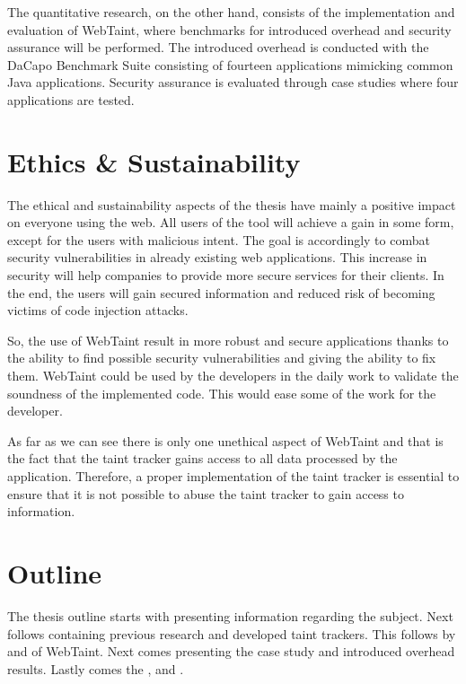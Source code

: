 The quantitative research, on the other hand, consists of the implementation and evaluation of WebTaint, where benchmarks for introduced overhead and security assurance will be performed. The introduced overhead is conducted with the DaCapo Benchmark Suite \parencite{dacapo} consisting of fourteen applications mimicking common Java applications. Security assurance is evaluated through case studies where four applications are tested.



\section{Ethics \& Sustainability}
\label{Ethics}
The ethical and sustainability aspects of the thesis have mainly a positive impact on everyone using the web. All users of the tool will achieve a gain in some form, except for the users with malicious intent. The goal is accordingly to combat security vulnerabilities in already existing web applications. This increase in security will help companies to provide more secure services for their clients. In the end, the users will gain secured information and reduced risk of becoming victims of code injection attacks.

So, the use of WebTaint result in more robust and secure applications thanks to the ability to find possible security vulnerabilities and giving the ability to fix them. WebTaint could be used by the developers in the daily work to validate the soundness of the implemented code. This would ease some of the work for the developer.

As far as we can see there is only one unethical aspect of WebTaint and that is the fact that the taint tracker gains access to all data processed by the application. Therefore, a proper implementation of the taint tracker is essential to ensure that it is not possible to abuse the taint tracker to gain access to information.



\section{Outline}
\label{Outline}
The thesis outline starts with \textit{} presenting information regarding the subject. Next follows \textit{} containing previous research and developed taint trackers. This follows by \textit{} and \textit{} of WebTaint. Next comes \textit{} presenting the case study and introduced overhead results. Lastly comes the \textit{}, \textit{} and \textit{}.
